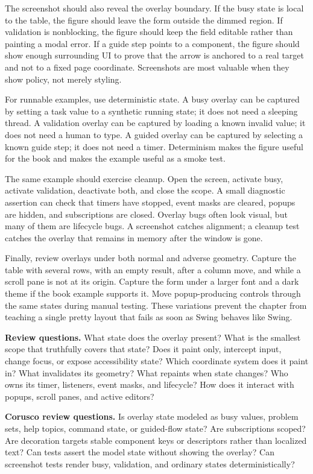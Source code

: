 The screenshot should also reveal the overlay boundary. If the busy state is
local to the table, the figure should leave the form outside the dimmed region.
If validation is nonblocking, the figure should keep the field editable rather
than painting a modal error. If a guide step points to a component, the figure
should show enough surrounding UI to prove that the arrow is anchored to a real
target and not to a fixed page coordinate. Screenshots are most valuable when
they show policy, not merely styling.

For runnable examples, use deterministic state. A busy overlay can be captured
by setting a task value to a synthetic running state; it does not need a sleeping
thread. A validation overlay can be captured by loading a known invalid value;
it does not need a human to type. A guided overlay can be captured by selecting
a known guide step; it does not need a timer. Determinism makes the figure
useful for the book and makes the example useful as a smoke test.

The same example should exercise cleanup. Open the screen, activate busy,
activate validation, deactivate both, and close the scope. A small diagnostic
assertion can check that timers have stopped, event masks are cleared, popups
are hidden, and subscriptions are closed. Overlay bugs often look visual, but
many of them are lifecycle bugs. A screenshot catches alignment; a cleanup test
catches the overlay that remains in memory after the window is gone.

Finally, review overlays under both normal and adverse geometry. Capture the
table with several rows, with an empty result, after a column move, and while a
scroll pane is not at its origin. Capture the form under a larger font and a
dark theme if the book example supports it. Move popup-producing controls
through the same states during manual testing. These variations prevent the
chapter from teaching a single pretty layout that fails as soon as Swing behaves
like Swing.

\textbf{Review questions.} What state does the overlay present? What is the smallest scope that truthfully covers that state? Does it paint only, intercept input, change focus, or expose accessibility state? Which coordinate system does it paint in? What invalidates its geometry? What repaints when state changes? Who owns its timer, listeners, event masks, and lifecycle? How does it interact with popups, scroll panes, and active editors?

\textbf{Corusco review questions.} Is overlay state modeled as busy values, problem sets, help topics, command state, or guided-flow state? Are subscriptions scoped? Are decoration targets stable component keys or descriptors rather than localized text? Can tests assert the model state without showing the overlay? Can screenshot tests render busy, validation, and ordinary states deterministically?


